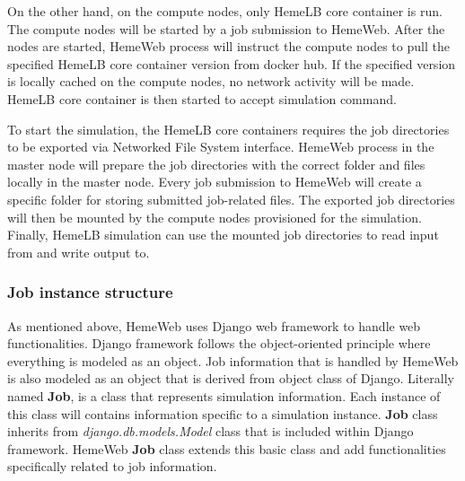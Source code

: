 On the other hand, on the compute nodes, only HemeLB core container is run. The compute nodes will be started by a job submission to HemeWeb. After the nodes are started, HemeWeb process will instruct the compute nodes to pull the specified HemeLB core container version from docker hub. If the specified version is locally cached on the compute nodes, no network activity will be made. HemeLB core container is then started to accept simulation command.

To start the simulation, the HemeLB core containers requires the job directories to be exported via Networked File System interface. HemeWeb process in the master node will prepare the job directories with the correct folder and files locally in the master node. Every job submission to HemeWeb will create a specific folder for storing submitted job-related files. The exported job directories will then be mounted by the compute nodes provisioned for the simulation. Finally, HemeLB simulation can use the mounted job directories to read input from and write output to.


\subsubsection{Job instance structure}

As mentioned above, HemeWeb uses Django web framework to handle web functionalities. Django framework follows the object-oriented principle where everything is modeled as an object. Job information that is handled by HemeWeb is also modeled as an object that is derived from object class of Django. Literally named \textbf{Job}, is a class that represents simulation information. Each instance of this class will contains information specific to a simulation instance. \textbf{Job} class inherits from \textit{django.db.models.Model} class that is included within Django framework. HemeWeb \textbf{Job} class extends this basic class and add functionalities specifically related to job information.


